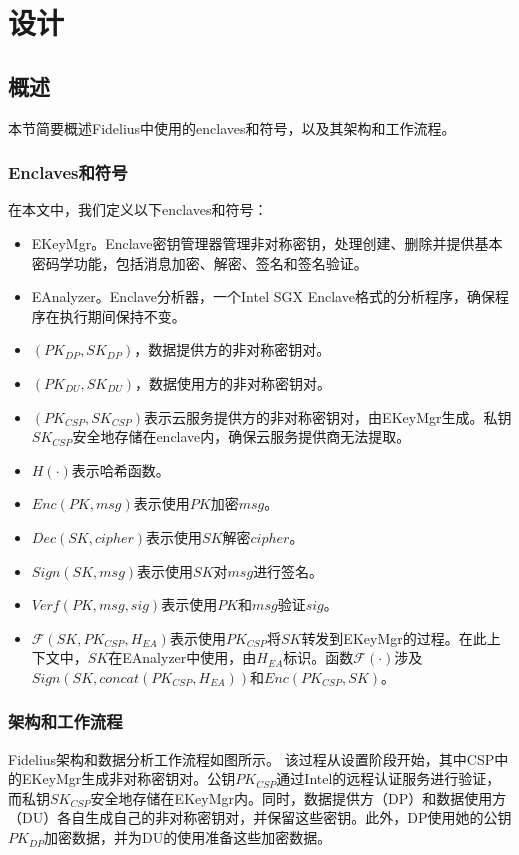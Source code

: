 \section{设计}

\subsection{概述}
本节简要概述Fidelius中使用的enclaves和符号，以及其架构和工作流程。

\subsubsection{Enclaves和符号}
在本文中，我们定义以下enclaves和符号：
\begin{itemize}
    \item EKeyMgr。Enclave密钥管理器管理非对称密钥，处理创建、删除并提供基本密码学功能，包括消息加密、解密、签名和签名验证。
    \item EAnalyzer。Enclave分析器，一个Intel SGX Enclave格式的分析程序，确保程序在执行期间保持不变。
    \item $(PK_{DP},SK_{DP})$，数据提供方的非对称密钥对。
    \item $(PK_{DU},SK_{DU})$，数据使用方的非对称密钥对。
    \item $(PK_{CSP}, SK_{CSP})$表示云服务提供方的非对称密钥对，由EKeyMgr生成。私钥$SK_{CSP}$安全地存储在enclave内，确保云服务提供商无法提取。
    \item $H(\cdot)$表示哈希函数。
    \item $Enc(PK, msg)$表示使用$PK$加密$msg$。
    \item $Dec(SK, cipher)$表示使用$SK$解密$cipher$。
    \item $Sign(SK, msg)$表示使用$SK$对$msg$进行签名。
    \item $Verf(PK, msg, sig)$表示使用$PK$和$msg$验证$sig$。
    \item $\mathcal{F}(SK, PK_{CSP}, H_{EA})$表示使用$PK_{CSP}$将$SK$转发到EKeyMgr的过程。在此上下文中，$SK$在EAnalyzer中使用，由$H_{EA}$标识。函数$\mathcal{F}(\cdot)$涉及$Sign(SK, concat(PK_{CSP}, H_{EA}))$和$Enc(PK_{CSP}, SK)$。
\end{itemize}

\subsubsection{架构和工作流程}

Fidelius架构和数据分析工作流程如图所示。
该过程从设置阶段开始，其中CSP中的EKeyMgr生成非对称密钥对。公钥$PK_{CSP}$通过Intel的远程认证服务进行验证，而私钥$SK_{CSP}$安全地存储在EKeyMgr内。同时，数据提供方（DP）和数据使用方（DU）各自生成自己的非对称密钥对，并保留这些密钥。此外，DP使用她的公钥$PK_{DP}$加密数据，并为DU的使用准备这些加密数据。

